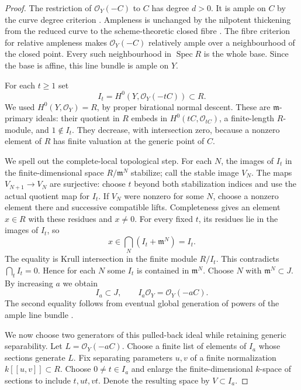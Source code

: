 \begin{proof}
The restriction of $\mathcal O_Y(-C)$ to $C$ has degree $d>0$.
It is ample on $C$ by the curve degree criterion
\citep[Lemma~33.44.14, Tag 0B5X]{StacksCartierParametersRoot}.
Ampleness is unchanged by the nilpotent thickening from the
reduced curve to the scheme-theoretic closed fibre
\citep[Lemma~32.11.4, Tag 09MW]{StacksCartierParametersRoot}.
The fibre criterion for relative ampleness
\citep[Lemma~30.21.4, Tag 0D2N]{StacksCartierParametersRoot}
makes $\mathcal O_Y(-C)$ relatively ample over a neighbourhood
of the closed point. Every such neighbourhood in
$\operatorname{Spec}R$ is the whole base. Since the base is
affine, this line bundle is ample on $Y$.

For each $t\ge1$ set
\[
                 I_t=H^0(Y,\mathcal O_Y(-tC))\subset R.
                                                        \tag{D.CP.3}
\]
We used $H^0(Y,\mathcal O_Y)=R$, by proper birational normal
descent. These are $\mathfrak m$-primary ideals: their quotient
in $R$ embeds in $H^0(tC,\mathcal O_{tC})$, a finite-length
$R$-module, and $1\notin I_t$.
They decrease, with intersection zero, because a nonzero
element of $R$ has finite valuation at the generic point of $C$.

We spell out the complete-local topological step. For each $N$,
the images of $I_t$ in the finite-dimensional space $R/\mathfrak m^N$
stabilize; call the stable image $V_N$. The maps
$V_{N+1}\to V_N$ are surjective: choose $t$ beyond both
stabilization indices and use the actual quotient map for $I_t$.
If $V_N$ were nonzero for some $N$, choose a nonzero element
there and successive compatible lifts. Completeness gives an
element $x\in R$ with these residues and $x\ne0$.
For every fixed $t$, its residues lie in the images of $I_t$,
so
\[
        x\in\bigcap_N(I_t+\mathfrak m^N)=I_t.
\]
The equality is Krull intersection in the finite module $R/I_t$.
This contradicts $\bigcap_t I_t=0$. Hence for each $N$ some
$I_t$ is contained in $\mathfrak m^N$. Choose $N$ with
$\mathfrak m^N\subset J$. By increasing $a$ we obtain
\[
        I_a\subset J,\qquad
        I_a\mathcal O_Y=\mathcal O_Y(-aC).
                                                        \tag{D.CP.4}
\]
The second equality follows from eventual global generation of
powers of the ample line bundle
\citep[Proposition~28.27.13, condition~(7) and its proof,
Tag 01PR]{StacksCartierParametersRoot}.

We now choose two generators of this pulled-back ideal while
retaining generic separability. Let $L=\mathcal O_Y(-aC)$.
Choose a finite list of elements of $I_a$ whose sections generate
$L$. Fix separating parameters $u,v$ of a finite normalization
$k[[u,v]]\subset R$. Choose $0\ne t\in I_a$ and enlarge the
finite-dimensional $k$-space of sections to include
$t,ut,vt$. Denote the resulting space by $V\subset I_a$.


\end{proof}
